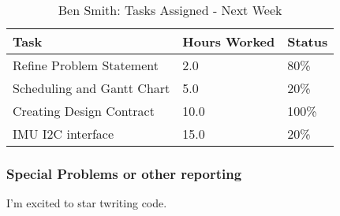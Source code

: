 \documentclass[12pt,article,compsoc]{IEEEtran}
\begin{document}
	\begin{table}[ht]
	\renewcommand{\arraystretch}{1.3}
		\caption{Ben Smith: Tasks Assigned - Next Week}
		
		\label{Summary of Ben Smith's activites: this week}
		
		\centering
		\begin{tabular}{p{5.5cm}|p{1cm}|p{1cm}}

		\hline
		\bfseries 	Task	            	 		& \bfseries Hours Worked	& \bfseries Status	\\
		\hline\hline
					Refine Problem Statement		& 2.0						& 80\%				\\
					Scheduling and Gantt Chart	    & 5.0						& 20\%				\\
                    Creating Design Contract        & 10.0                      & 100\%             \\
                    IMU I2C interface               & 15.0                      & 20\%              \\
		\hline
		\end{tabular}
	\end{table}

	\subsubsection*{Special Problems or other reporting}
    I'm excited to star twriting code.
\end{document}
